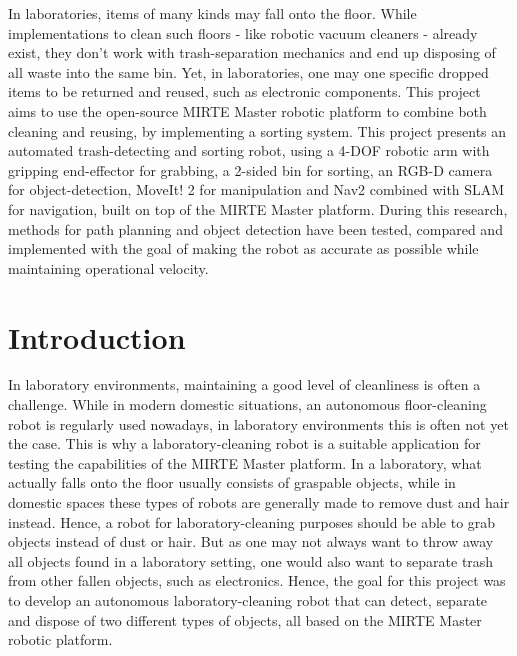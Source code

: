 In laboratories, items of many kinds may fall onto the floor. While implementations to clean such floors - like robotic vacuum cleaners - already exist, they don't work with trash-separation mechanics and end up disposing of all waste into the same bin. Yet, in laboratories, one may one specific dropped items to be returned and reused, such as electronic components. This project aims to use the open-source MIRTE Master robotic platform to combine both cleaning and reusing, by implementing a sorting system. This project presents an automated trash-detecting and sorting robot, using a 4-DOF robotic arm with gripping end-effector for grabbing, a 2-sided bin for sorting, an RGB-D camera for object-detection, MoveIt! 2 for manipulation and Nav2 combined with SLAM for navigation, built on top of the MIRTE Master platform. During this research, methods for path planning and object detection have been tested, compared and implemented with the goal of making the robot as accurate as possible while maintaining operational velocity.


\section{Introduction}

In laboratory environments, maintaining a good level of cleanliness is often a challenge. While in modern domestic situations, an autonomous floor-cleaning robot is regularly used nowadays, in laboratory environments this is often not yet the case. This is why a laboratory-cleaning robot is a suitable application for testing the capabilities of the MIRTE Master platform. In a laboratory, what actually falls onto the floor usually consists of graspable objects, while in domestic spaces these types of robots are generally made to remove dust and hair instead. Hence, a robot for laboratory-cleaning purposes should be able to grab objects instead of dust or hair. But as one may not always want to throw away all objects found in a laboratory setting, one would also want to separate trash from other fallen objects, such as electronics. Hence, the goal for this project was to develop an autonomous laboratory-cleaning robot that can detect, separate and dispose of two different types of objects, all based on the MIRTE Master robotic platform.

